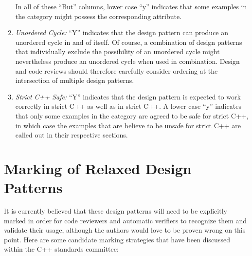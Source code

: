 \documentclass[10]{article}
\begin{document}
\begin{enumerate}
	In all of these ``But'' columns, lower case ``y'' indicates
	that some examples in the category might possess the corresponding
	attribute.
\item	\emph{Unordered Cycle:}  ``Y'' indicates that the design pattern
	can produce an unordered cycle in and of itself.
	Of course, a combination of design patterns that individually
	exclude the possibility of an unordered cycle might nevertheless
	produce an unordered cycle when used in combination.
	Design and code reviews should therefore carefully consider
	ordering at the intersection of multiple design patterns.
\item	\emph{Strict C++ Safe:} ``Y'' indicates that the design pattern is
	expected to work correctly in strict C++ as well as in strict C++.
	A lower case ``y'' indicates that only some examples in the
	category are agreed to be safe for strict C++, in which case
	the examples that are believe to be unsafe for strict C++ are
	called out in their respective sections.
\end{enumerate}

\section{Marking of Relaxed Design Patterns}
\label{sec:Marking of Relaxed Design Patterns}

It is currently believed that these design patterns will need to be
explicitly marked in order for code reviewers and automatic verifiers
to recognize them and validate their usage, although the authors would
love to be proven wrong on this point.
Here are some candidate marking strategies that have been discussed
within the C++ standards committee:
\end{document}
